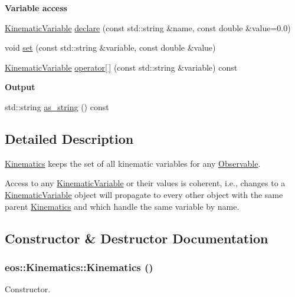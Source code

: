 \begin{Indent}{\bf Variable access}\par
{\em \label{_amgrp5c463b2e556064c0e8e1d0475c962a4c}
 }\begin{DoxyCompactItemize}
\item 
\hyperlink{classeos_1_1KinematicVariable}{KinematicVariable} \hyperlink{classeos_1_1Kinematics_a0db9fd05c920dae2e0b0556dba0ebb08}{declare} (const std::string \&name, const double \&value=0.0)
\item 
void \hyperlink{classeos_1_1Kinematics_aeca2fb170ac958269fdc735ddf8bd241}{set} (const std::string \&variable, const double \&value)
\item 
\hyperlink{classeos_1_1KinematicVariable}{KinematicVariable} \hyperlink{classeos_1_1Kinematics_acb41cb59e57011e701785db06164343c}{operator\mbox{[}$\,$\mbox{]}} (const std::string \&variable) const 
\end{DoxyCompactItemize}
\end{Indent}
\begin{Indent}{\bf Output}\par
{\em \label{_amgrp29c2c02a361c9d7028472e5d92cd4a54}
 }\begin{DoxyCompactItemize}
\item 
std::string \hyperlink{classeos_1_1Kinematics_a297facfe690f7f805d4af5e32b739af9}{as\_\-string} () const 
\end{DoxyCompactItemize}
\end{Indent}


\subsection{Detailed Description}
\hyperlink{classeos_1_1Kinematics}{Kinematics} keeps the set of all kinematic variables for any \hyperlink{classeos_1_1Observable}{Observable}.

Access to any \hyperlink{classeos_1_1KinematicVariable}{KinematicVariable} or their values is coherent, i.e., changes to a \hyperlink{classeos_1_1KinematicVariable}{KinematicVariable} object will propagate to every other object with the same parent \hyperlink{classeos_1_1Kinematics}{Kinematics} and which handle the same variable by name. 

\subsection{Constructor \& Destructor Documentation}
\hypertarget{classeos_1_1Kinematics_a5385a72bcc6db8568a82808d6f02aa9b}{
\subsubsection[{Kinematics}]{\setlength{\rightskip}{0pt plus 5cm}eos::Kinematics::Kinematics ()}}
\label{classeos_1_1Kinematics_a5385a72bcc6db8568a82808d6f02aa9b}
Constructor.

